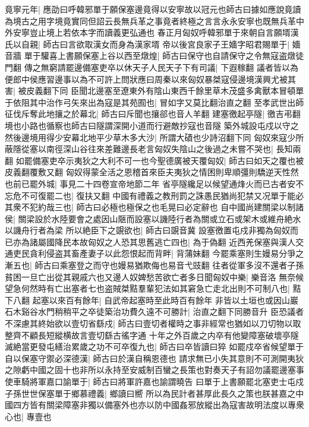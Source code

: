 竟寧元年|{
	應劭曰呼韓邪單于願保塞邊竟得以安寧故以冠元也師古曰據如應說竟讀為境古之用字境竟實同但詔云長無兵革之事竟者終極之言言永永安寧也既無兵革中外安寧豈止境上若依本字而讀義更弘通也}
春正月匈奴呼韓邪單于來朝自言願壻漢氏以自親|{
	師古曰言欲取漢女而身為漢家壻}
帝以後宮良家子王嬙字昭君賜單于|{
	嬙音牆}
單于驩喜上書願保塞上谷以西至燉煌|{
	師古曰保守也自請保守之令無寇盗燉徒門翻}
傳之無窮請罷邊備塞吏卒以休天子人民天子下有司議|{
	下遐稼翻}
議者皆以為便郎中侯應習邊事以為不可許上問狀應曰周秦以來匈奴暴桀寇侵邊境漢興尤被其害|{
	被皮義翻下同}
臣聞北邊塞至遼東外有陰山東西千餘里草木茂盛多禽獸本冒頓單于依阻其中治作弓矢來出為寇是其苑囿也|{
	冒如字又莫比翻治直之翻}
至孝武世出師征伐斥奪此地攘之於幕北|{
	師古曰斥聞也攘郤也音人羊翻}
建塞徼起亭隧|{
	徼吉弔翻境也小路也循察也師古曰隧謂深開小道而行避敵抄寇也音隧}
築外城設屯戍以守之然後邊境用得少安幕北地平少草木多大沙|{
	所謂大磧也少詩沼翻下同}
匈奴來寇少所蔽隱從塞以南徑深山谷往來差難邊長老言匈奴失陰山之後過之未嘗不哭也|{
	長知兩翻}
如罷備塞吏卒示夷狄之大利不可一也今聖德廣被天覆匈奴|{
	師古曰如天之覆也被皮義翻覆敷又翻}
匈奴得蒙全活之恩稽首來臣夫夷狄之情困則卑順彊則驕逆天性然也前已罷外城|{
	事見二十四卷宣帝地節二年}
省亭隧纔足以候望通烽火而已古者安不忘危不可復罷二也|{
	復扶又翻}
中國有禮義之教刑罰之誅愚民猶尚犯禁又况單于能必其衆不犯約哉三也|{
	師古曰必極也極保之也毛晃曰必定辭也}
自中國尚建關梁以制諸侯|{
	關梁設於水陸要會之處因山陿而設塞以譏陸行者為關或立石或架木或維舟絶水以譏舟行者為梁}
所以絶臣下之覬欲也|{
	師古曰覬音冀}
設塞徼置屯戍非獨為匈奴而已亦為諸屬國降民本故匈奴之人恐其思舊逃亡四也|{
	為于偽翻}
近西羌保塞與漢人交通吏民貪利侵盗其畜產妻子以此怨恨起而背畔|{
	背蒲妹翻}
今罷乘塞則生嫚易分爭之漸五也|{
	師古曰乘塞登之而守也嫚易猶欺侮也易音弋豉翻}
往者從軍多沒不還者子孫貧困一旦亡出從其親戚六也又邊人奴婢愁苦欲亡者多日聞匈奴中樂|{
	樂音洛}
無奈候望急何然時有亡出塞者七也盗賊桀黠羣輩犯法如其窘急亡走北出則不可制八也|{
	黠下八翻}
起塞以來百有餘年|{
	自武帝起塞時至此時百有餘年}
非皆以土垣也或因山巖石木谿谷水門稍稍平之卒徒築治功費久遠不可勝計|{
	治直之翻下同勝音升}
臣恐議者不深慮其終始欲以壹切省繇戍|{
	師古曰壹切者權時之事非經常也猶如以刀切物以取整齊不顧長短縱横故言壹切繇古徭字通}
十年之外百歲之内卒有他變障塞破壞亭隧滅絶當更發屯繕治累歲之功不可卒復九也|{
	師古曰卒皆讀曰猝}
如罷戍卒省候望單于自以保塞守禦必深德漢|{
	師古曰於漢自稱恩德也}
請求無已小失其意則不可測開夷狄之隙虧中國之固十也非所以永持至安威制百蠻之長策也對奏天子有詔勿議罷邊塞事使車騎將軍嘉口諭單于|{
	師古曰將軍許嘉也諭謂曉告}
曰單于上書願罷北塞吏士屯戍子孫世世保塞單于鄉慕禮義|{
	鄉讀曰嚮}
所以為民計者甚厚此長久之策也朕甚嘉之中國四方皆有關梁障塞非獨以備塞外也亦以防中國姦邪放縱出為寇害故明法度以專衆心也|{
	專壹也}
